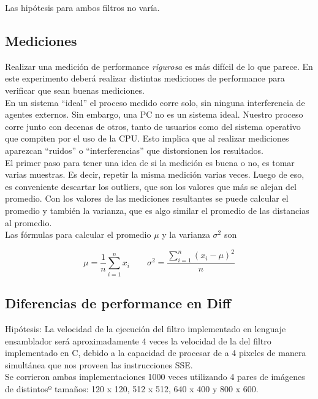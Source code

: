 \documentclass[10pt,a4paper,spanish]{article}
\begin{document}
Las hipótesis para ambos filtros no varía.

\subsection{Mediciones}

Realizar una medición de performance \emph{rigurosa} es más difícil de lo que parece. En este experimento deberá realizar distintas mediciones de performance para verificar que sean buenas mediciones. \\

En un sistema ``ideal'' el proceso medido corre solo, sin ninguna interferencia de agentes externos. Sin embargo, una PC no es un sistema ideal. Nuestro proceso corre junto con decenas de otros, tanto de usuarios como del sistema operativo que compiten por el uso de la CPU. Esto implica que al realizar mediciones aparezcan ``ruidos'' o ``interferencias'' que distorsionen los resultados. \\

El primer paso para tener una idea de si la medición es buena o no, es tomar varias muestras. Es decir, repetir la misma medición varias veces. Luego de eso, es conveniente descartar los outliers, que son los valores que más se alejan del promedio. Con los valores de las mediciones resultantes se puede calcular el promedio y también la varianza, que es algo similar el promedio de las distancias al promedio. \\

Las fórmulas para calcular el promedio $\mu$ y la varianza $\sigma^2$ son

$$
\mu = \frac{1}{n}\sum_{i=1}^{n} x_i \qquad \sigma^2 = \frac{\displaystyle\sum_{i=1}^{n}(x_i - \mu)^2} {n}
$$

\subsection{Diferencias de performance en Diff}

Hipótesis: La velocidad de la ejecución del filtro implementado en lenguaje ensamblador será aproximadamente 4 veces la velocidad de la del filtro implementado en C, debido a la capacidad de procesar de a 4 pixeles de manera simultánea que nos proveen las instrucciones SSE. \\

Se corrieron ambas implementaciones 1000 veces utilizando 4 pares de imágenes de distintosº tamaños: 120 x 120, 512 x 512, 640 x 400 y 800 x 600. \\
\end{document}
